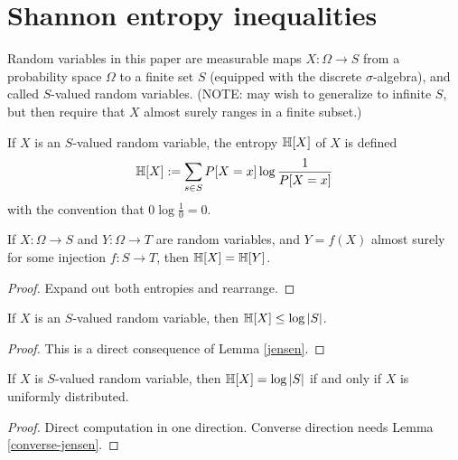 \chapter{Shannon entropy inequalities}

Random variables in this paper are measurable maps $X : \Omega \to S$ from a probability space $\Omega$ to a finite set $S$ (equipped with the discrete $\sigma$-algebra), and called $S$-valued random variables.
(NOTE: may wish to generalize to infinite $S$, but then require that $X$ almost surely ranges in a finite subset.)

\begin{definition}[Entropy]
  \label{entropy-def}
  \leanok
  If $X$ is an $S$-valued random variable, the entropy $\mathbb{H}[X]$ of $X$ is defined
  $$ \mathbb{H}[X] := \sum_{s \in S} P[X=x] \log \frac{1}{P[X=x]}$$
  with the convention that $0 \log \frac{1}{0} = 0$.
\end{definition}

\begin{lemma}\label{relabeled-entropy} 
  If $X: \Omega \to S$ and $Y: \Omega \to T$ are random variables, and $Y = f(X)$ almost surely for some injection $f: S \to T$, then $\mathbb{H}[X] = \mathbb{H}[Y]$.
\end{lemma}

\begin{proof} \leanok Expand out both entropies and rearrange.
\end{proof}

\begin{lemma}\label{jensen-bound}
  \leanok
  If $X$ is an $S$-valued random variable, then $\mathbb{H}[X] \leq \log |S|$.
\end{lemma}

\begin{proof}\leanok
  This is a direct consequence of Lemma \ref{jensen}.
\end{proof}

\begin{lemma}\label{uniform-entropy}
  \leanok
  If $X$ is $S$-valued random variable, then $\mathbb{H}[X] = \log |S|$ if and only if $X$ is uniformly distributed.
\end{lemma}

\begin{proof}  Direct computation in one direction.  Converse direction needs Lemma \ref{converse-jensen}.
\end{proof}

